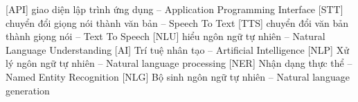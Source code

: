  [API]   {giao diện lập trình ứng dụng -- Application Programming Interface}
 [STT]   {chuyển đổi giọng nói thành văn bản -- Speech To Text}
 [TTS]   {chuyển đổi văn bản thành giọng nói -- Text To Speech}
 [NLU]   {hiểu ngôn ngữ tự nhiên -- Natural Language Understanding}
  [AI]    {Trí tuệ nhân tạo -- Artificial Intelligence}
 [NLP]    {Xử lý ngôn ngữ tự nhiên -- Natural language processing}
 [NER]    {Nhận dạng thực thể -- Named Entity Recognition}
 [NLG]    {Bộ sinh ngôn ngữ tự nhiên -- Natural language generation}